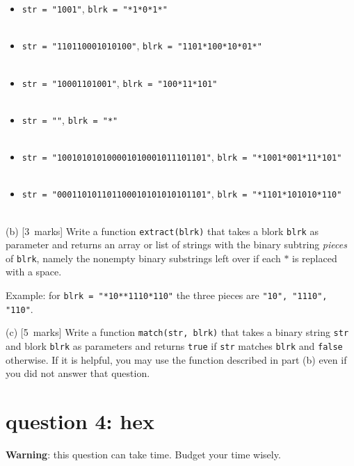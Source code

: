 \documentclass[12pt]{article}
\newcommand{\mymarks}[1]{\mbox{\small [#1 marks]}}
\begin{document}
\begin{itemize}
\item \verb&str = "1001"&, \verb&blrk = "*1*0*1*"& \\~\\
\item \verb&str = "110110001010100"&, \verb&blrk = "1101*100*10*01*"& \\~\\
\item \verb&str = "10001101001"&, \verb&blrk = "100*11*101"& \\~\\
\item \verb&str = ""&, \verb&blrk = "*"& \\~\\
\item \verb&str = "100101010100001010001011101101"&, \verb&blrk = "*1001*001*11*101"& \\~\\
\item \verb&str = "000110101101100010101010101101"&, \verb&blrk = "*1101*101010*110"& \\~\\
\end{itemize}

\newpage
(b) \mymarks{3}
Write a function \verb&extract(blrk)& that takes a blork \texttt{blrk} 
as parameter and returns an array or list of strings 
with the binary subtring {\em pieces}
of \texttt{blrk}, namely the
nonempty binary substrings left over
if each $*$ is replaced with a space.

Example: for \texttt{blrk = "*10**1110*110"} the three 
pieces are \verb&"10", "1110", "110"&.

\vfill

(c) \mymarks{5}
Write a function \verb&match(str, blrk)& that takes a binary string \verb&str& and blork \verb&blrk& as parameters and returns \verb&true& if \verb&str& matches \verb&blrk& and \verb&false& otherwise. If it is helpful, you may use the function described in part (b) even if you did not 
answer that question.

\vfill


\newpage
\section*{question 4: hex}

{\bf Warning}: this question can take time. 
Budget your time wisely.
\end{document}
